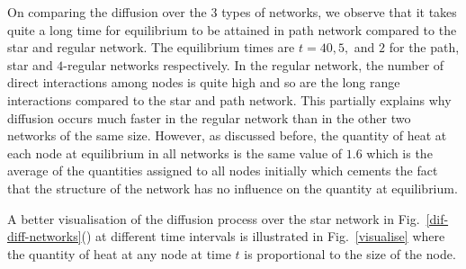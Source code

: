 \documentclass[10pt,a4paper]{article}
\begin{document}
On comparing the diffusion over the $3$ types of networks, we observe that it takes quite a long time for equilibrium to be attained in path network compared to the star and regular network. The equilibrium times are $t= 40, 5,$ and $2$ for the path, star and $4$-regular networks respectively.   
In the regular network, the number of direct interactions among nodes is quite high and so are the long range interactions compared to the star and path network. This partially explains why diffusion occurs much faster in the regular network than in the other two networks of the same size. However, as discussed before, the quantity of heat at each node at equilibrium in all networks is the same value of $1.6$ which is the average of the quantities assigned to all nodes initially which cements the fact that the structure of the network has no influence on the quantity at equilibrium.

A better visualisation of the diffusion process over the star network in Fig.~\ref{dif-diff-networks}() at different time intervals is illustrated in Fig.~\ref{visualise} where the quantity of heat at any node at time $t$ is proportional to the size of the node.
\end{document}
